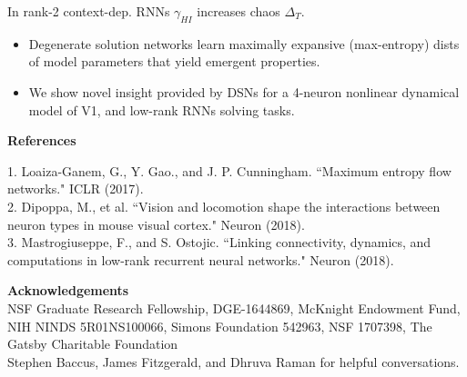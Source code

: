 \documentclass[landscape]{article}
\newcommand{\mysection}[1]{{\color[rgb]{.6,0,0}{\section*{{\HUGE #1}
        {\leaders\hrule height .2ex\hfill\kern0pt}}}}}
\begin{document}
\begin{multicols*}{4}
\begin{mybox}
\begin{multicols*}{2}
\columnbreak


In rank-2 context-dep. RNNs $\gamma_{HI}$ increases chaos $\Delta_T$.
\begin{center}
\end{center}
\end{multicols*}
\end{mybox}

\mysection{Summary}
\begin{itemize}
\item Degenerate solution networks learn maximally expansive (max-entropy) dists of model parameters that yield emergent properties.
\item We show novel insight provided by DSNs for a 4-neuron nonlinear dynamical model of V1, and low-rank RNNs solving tasks.
\end{itemize}


\large

{\bf\Large References}

1. Loaiza-Ganem, G., Y. Gao., and J. P. Cunningham. ``Maximum entropy flow networks." ICLR (2017). \\
2. Dipoppa, M., et al. ``Vision and locomotion shape the interactions between neuron types in mouse visual cortex." Neuron (2018). \\
3. Mastrogiuseppe, F., and S. Ostojic. ``Linking connectivity, dynamics, and computations in low-rank recurrent neural networks." Neuron (2018).

{\bf\Large Acknowledgements} \\
NSF Graduate Research Fellowship,  DGE-1644869, McKnight Endowment Fund, NIH NINDS 5R01NS100066, Simons Foundation 542963, NSF 1707398, The Gatsby Charitable Foundation \\
Stephen Baccus, James Fitzgerald, and Dhruva Raman for helpful conversations.

\end{multicols*}
\end{document}
